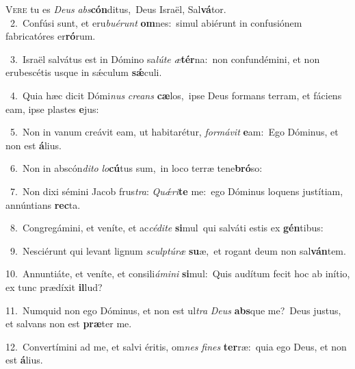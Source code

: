 \lettrine{\initial\textcolor{\initialcolor}{V}}{ere} tu es \textit{De}\-\textit{us} \textit{abs}\-\textbf{cón}ditus,~\star Deus Israël, Sal\-\textbf{vá}\-tor.\\
{\numbfont\textcolor{\numbcolor}{~2.}}~Confúsi sunt, et eru\-\textit{bu}\-\textit{é}\textit{runt} \textbf{om}\-nes:~\star simul abiérunt in confusiónem fabricatóres er\-\textbf{ró}\-rum.\par
{\numbfont\textcolor{\numbcolor}{~3.}}~Israël salvátus est in Dómino sa\-\textit{lú}\-\textit{te} \textit{æ}\-\textbf{tér}na:~\star non confundémini, et non erubescétis usque in sǽculum \textbf{sǽ}\-culi.\par
{\numbfont\textcolor{\numbcolor}{~4.}}~Quia hæc dicit Dómi\textit{nus} \textit{cre}\-\textit{ans} \textbf{cæ}\-los,~\star ipse Deus formans terram, et fáciens eam, ipse plastes \textbf{e}\-jus:\par
{\numbfont\textcolor{\numbcolor}{~5.}}~Non in vanum creávit eam, ut habitarétur, \textit{for}\-\textit{má}\textit{vit} \textbf{e}\-am:~\star Ego Dóminus, et non est \textbf{á}\-lius.\par
{\numbfont\textcolor{\numbcolor}{~6.}}~Non in abscón\-\textit{di}\-\textit{to} \textit{lo}\-\textbf{cú}tus sum,~\star in loco terræ tene\-\textbf{bró}\-so:\par
{\numbfont\textcolor{\numbcolor}{~7.}}~Non dixi sémini Jacob frus\-\textit{tra}\-: \textit{Quǽ}\-\textit{ri}\textbf{te} me:~\star ego Dóminus loquens justítiam, annúntians \textbf{rec}\-ta.\par
{\numbfont\textcolor{\numbcolor}{~8.}}~Congregámini, et veníte, et ac\-\textit{cé}\-\textit{di}\textit{te} \textbf{si}\-mul~\star qui salváti estis ex \textbf{gén}\-tibus:\par
{\numbfont\textcolor{\numbcolor}{~9.}}~Nesciérunt qui levant lignum \textit{sculp}\-\textit{tú}\textit{ræ} \textbf{su}\-æ,~\star et rogant deum non sal\-\textbf{ván}\-tem.\par
{\numbfont\textcolor{\numbcolor}{10.}}~Annuntiáte, et veníte, et consili\-\textit{á}\-\textit{mi}\textit{ni} \textbf{si}\-mul:~\star Quis audítum fecit hoc ab inítio, ex tunc prædíxit \textbf{il}\-lud?\par
{\numbfont\textcolor{\numbcolor}{11.}}~Numquid non ego Dóminus, et non est ul\textit{tra} \textit{De}\-\textit{us} \textbf{abs}\-que me?~\star Deus justus, et salvans non est \textbf{præ}\-ter me.\par
{\numbfont\textcolor{\numbcolor}{12.}}~Convertímini ad me, et salvi éritis, om\textit{nes} \textit{fi}\-\textit{nes} \textbf{ter}\-ræ:~\star quia ego Deus, et non est \textbf{á}\-lius.\par
